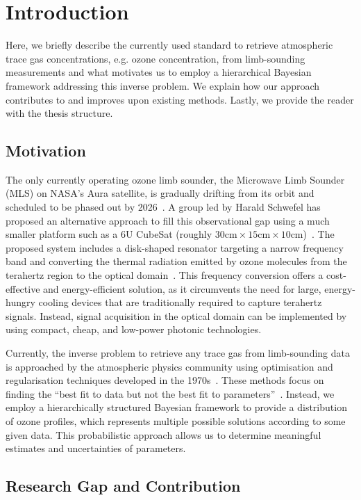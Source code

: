 \chapter{Introduction}
\thispagestyle{empty}
Here, we briefly describe the currently used standard to retrieve atmospheric trace gas concentrations, e.g. ozone concentration, from limb-sounding measurements and what motivates us to employ a hierarchical Bayesian framework addressing this inverse problem.
We explain how our approach contributes to and improves upon existing methods.
Lastly, we provide the reader with the thesis structure.


\section{Motivation}
The only currently operating ozone limb sounder, the Microwave Limb Sounder (MLS) on NASA's Aura satellite, is gradually drifting from its orbit and scheduled to be phased out by 2026~\cite{Bryan2024NASA}.
A group led by Harald Schwefel has proposed an alternative approach to fill this observational gap using a much smaller platform such as a 6U CubeSat (roughly $30\text{cm} \times 15\text{cm} \times 10\text{cm}$)~\cite{ustin2024current}. 
The proposed system includes a disk-shaped resonator targeting a narrow frequency band and converting the thermal radiation emitted by ozone molecules from the terahertz region to the optical domain~\cite{Suresh25,Sedlmeir14}. 
This frequency conversion offers a cost-effective and energy-efficient solution, as it circumvents the need for large, energy-hungry cooling devices that are traditionally required to capture terahertz signals. 
Instead, signal acquisition in the optical domain can be implemented by using compact, cheap, and low-power photonic technologies.

Currently, the inverse problem to retrieve any trace gas from limb-sounding data is approached by the atmospheric physics community using optimisation and regularisation techniques developed in the 1970s~\cite{rodgers1976retrieval, NASA2022MLSv5}.
These methods focus on finding the ``best fit to data but not the best fit to parameters''~\cite{tan2016LecNot}.
Instead, we employ a hierarchically structured Bayesian framework to provide a distribution of ozone profiles, which represents multiple possible solutions according to some given data.
This probabilistic approach allows us to determine meaningful estimates and uncertainties of parameters.

\section{Research Gap and Contribution}


